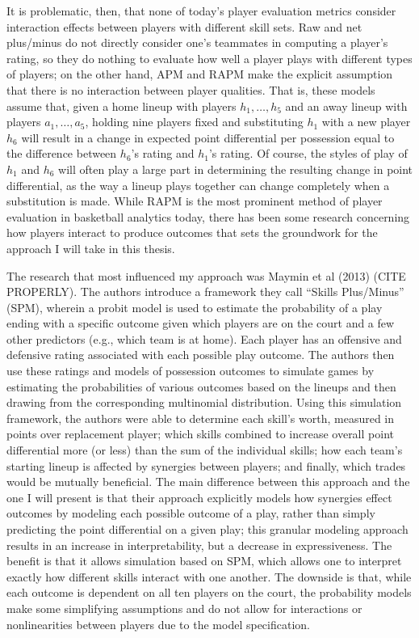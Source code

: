 It is problematic, then, that none of today's player evaluation metrics consider
interaction effects between players with different skill sets. Raw and net
plus/minus do not directly consider one's teammates in computing a player's rating,
so they do nothing to evaluate how well a player plays with different types of
players; on the other hand, APM and RAPM make the explicit assumption that there is
no interaction between player qualities. That is, these models assume that, given a
home lineup with players $h_1, \dots, h_5$ and an away lineup with players $a_1,
\dots, a_5$, holding nine players fixed and substituting $h_1$ with a new player
$h_6$ will result in a change in expected point differential per possession equal to
the difference between $h_6$'s rating and $h_1$'s rating. Of course, the styles of
play of $h_1$ and $h_6$ will often play a large part in determining the resulting
change in point differential, as the way a lineup plays together can change
completely when a substitution is made. While RAPM is the most prominent method of
player evaluation in basketball analytics today, there has been some research
concerning how players interact to produce outcomes that sets the groundwork for the
approach I will take in this thesis.

The research that most influenced my approach was Maymin et al (2013) (CITE
PROPERLY). The authors introduce a framework they call ``Skills Plus/Minus'' (SPM),
wherein a probit model is used to estimate the probability of a play ending with a
specific outcome given which players are on the court and a few other predictors
(e.g., which team is at home). Each player has an offensive and defensive rating
associated with each possible play outcome. The authors then use these ratings and
models of possession outcomes to simulate games by estimating the probabilities of
various outcomes based on the lineups and then drawing from the corresponding
multinomial distribution.  Using this simulation framework, the authors were able to
determine each skill's worth, measured in points over replacement player; which
skills combined to increase overall point differential more (or less) than the sum
of the individual skills; how each team’s starting lineup is affected by synergies
between players; and finally, which trades would be mutually beneficial. The main
difference between this approach and the one I will present is that their approach
explicitly models how synergies effect outcomes by modeling each possible outcome of
a play, rather than simply predicting the point differential on a given play; this
granular modeling approach results in an increase in interpretability, but a
decrease in expressiveness. The benefit is that it allows simulation based on SPM,
which allows one to interpret exactly how different skills interact with one
another. The downside is that, while each outcome is dependent on all ten players on
the court, the probability models make some simplifying assumptions and do not allow
for interactions or nonlinearities between players due to the model specification.


